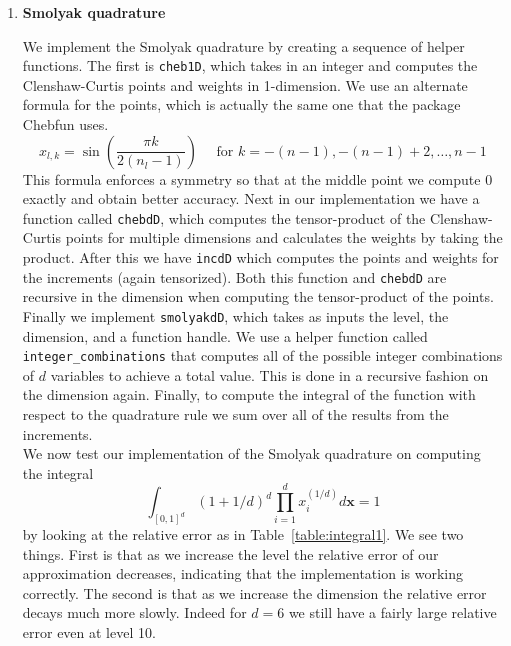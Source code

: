 \documentclass[12pt]{article}
\begin{document}
\begin{enumerate}

\item {\large \textbf{Smolyak quadrature}}

\hspace{0.5cm} We implement the Smolyak quadrature by creating a sequence of helper functions.  The first is {\tt cheb1D}, which takes in an integer and computes the Clenshaw-Curtis points and weights in 1-dimension.  We use an alternate formula for the points, which is actually the same one that the package Chebfun uses.
\begin{equation}
\label{eq:chebpts}
x_{l,k} = \sin \left( \frac{\pi k }{2(n_l - 1)}  \right) \quad \text{ for } k = -(n-1), -(n-1)+2,\ldots, n-1
\end{equation}
This formula enforces a symmetry so that at the middle point we compute 0 exactly and obtain better accuracy.  Next in our implementation we have a function called {\tt chebdD}, which computes the tensor-product of the Clenshaw-Curtis points for multiple dimensions and calculates the weights by taking the product.  After this we have {\tt incdD} which computes the points and weights for the increments (again tensorized).  Both this function and {\tt chebdD} are recursive in the dimension when computing the tensor-product of the points.  Finally we implement {\tt smolyakdD}, which takes as inputs the level, the dimension, and a function handle.  We use a helper function called {\tt integer\_combinations} that computes all of the possible integer combinations of $d$ variables to achieve a total value.  This is done in a recursive fashion on the dimension again.  Finally, to compute the integral of the function with respect to the quadrature rule we sum over all of the results from the increments.\\


\hspace{0.5cm} We now test our implementation of the Smolyak quadrature on computing the integral
\begin{equation}
\label{eq:integral1}
\int_{[0,1]^d} \left( 1 + 1/d\right)^d \prod_{i=1}^d x_i^{(1/d)} d{\bm x} = 1
\end{equation}
by looking at the relative error as in Table~\ref{table:integral1}.  We see two things.  First is that as we increase the level the relative error of our approximation decreases, indicating that the implementation is working correctly.  The second is that as we increase the dimension the relative error decays much more slowly.  Indeed for $d=6$ we still have a fairly large relative error even at level 10.


\end{enumerate}
\end{document}
